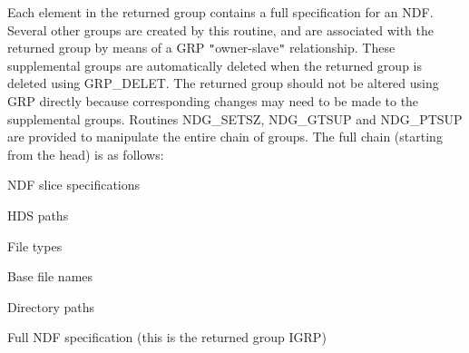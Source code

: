 \documentclass[twoside,11pt,nolof]{starlink}
\begin{document}
{{{         \sstitem
         Each element in the returned group contains a full specification
         for an NDF. Several other groups are created by this routine, and
         are associated with the returned group by means of a GRP \texttt{"}owner-slave\texttt{"}
         relationship. These supplemental groups are automatically deleted
         when the returned group is deleted using GRP\_DELET. The returned
         group should not be altered using GRP directly because corresponding
         changes may need to be made to the supplemental groups. Routines
         NDG\_SETSZ, NDG\_GTSUP and NDG\_PTSUP are provided to manipulate the
         entire chain of groups. The full chain (starting from the head) is
         as follows:

         \sstitem
            NDF slice specifications

         \sstitem
            HDS paths

         \sstitem
            File types

         \sstitem
            Base file names

         \sstitem
            Directory paths

         \sstitem
            Full NDF specification (this is the returned group IGRP)
      }
   }
}
\end{document}
